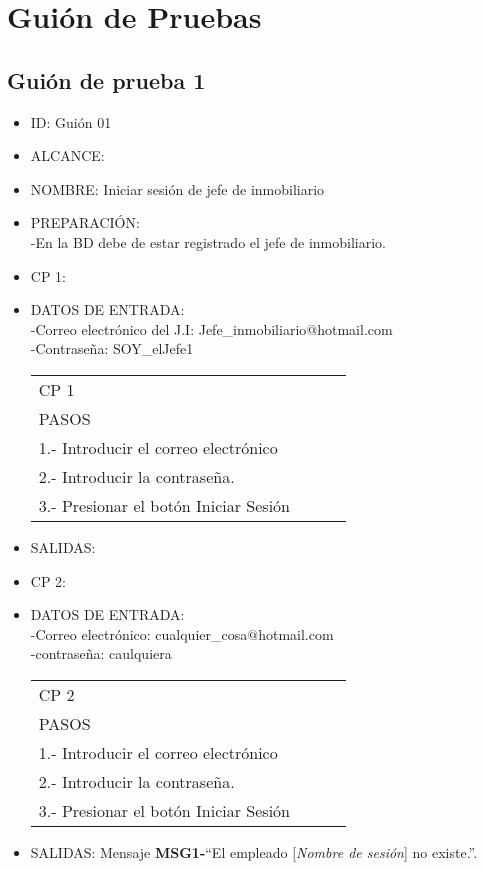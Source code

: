 \section{Guión de Pruebas}

\subsection{Guión de prueba 1}
\begin{itemize}
\item ID: Guión 01
\item ALCANCE: 
\item NOMBRE: Iniciar sesión de jefe de inmobiliario  
\item PREPARACIÓN:\\
-En la BD debe de estar registrado el jefe de inmobiliario.
\item CP 1:
\item DATOS DE ENTRADA:\\
	-Correo electrónico del J.I: Jefe\_inmobiliario$@$hotmail.com\\
	-Contraseña: SOY\_elJefe1
\begin{center}			
	\begin{tabular}{|l|l|l|l|}
		\hline
		CP 1\\
		PASOS\\
		\hline 1.- Introducir el correo electrónico\\
		\hline 2.- Introducir la contraseña.\\
		\hline 3.- Presionar el botón Iniciar Sesión\\
		\hline
	\end{tabular}
\end{center}
\item SALIDAS: \label{CU1LoginJI}
\item CP 2:
\item DATOS DE ENTRADA:\\
	-Correo electrónico: cualquier\_cosa$@$hotmail.com\\
	-contraseña: caulquiera
\begin{center}			
	\begin{tabular}{|l|l|l|l|}
		\hline
		CP 2\\
		PASOS\\
		\hline 1.- Introducir el correo electrónico\\
		\hline 2.- Introducir la contraseña.\\
		\hline 3.- Presionar el botón Iniciar Sesión\\
		\hline
	\end{tabular}
\end{center}
\item SALIDAS: Mensaje {\bf MSG1-}``El empleado [{\em Nombre de sesión}] no existe.''.
  

\end{itemize}
